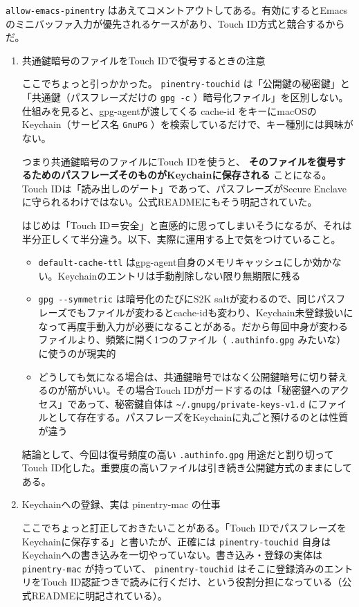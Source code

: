 \documentclass[11pt]{article}
\begin{document}
\texttt{allow-emacs-pinentry} はあえてコメントアウトしてある。有効にするとEmacsのミニバッファ入力が優先されるケースがあり、Touch ID方式と競合するからだ。
\begin{enumerate}
\item 共通鍵暗号のファイルをTouch IDで復号するときの注意
\label{sec:org3da6a7f}

ここでちょっと引っかかった。 \texttt{pinentry-touchid} は「公開鍵の秘密鍵」と「共通鍵（パスフレーズだけの \texttt{gpg -c}  ）暗号化ファイル」を区別しない。仕組みを見ると、gpg-agentが渡してくる cache-id をキーにmacOSのKeychain（サービス名 \texttt{GnuPG} ）を検索しているだけで、キー種別には興味がない。

つまり共通鍵暗号のファイルにTouch IDを使うと、 \textbf{そのファイルを復号するためのパスフレーズそのものがKeychainに保存される} ことになる。Touch IDは「読み出しのゲート」であって、パスフレーズがSecure Enclaveに守られるわけではない。公式READMEにもそう明記されていた。

はじめは「Touch ID＝安全」と直感的に思ってしまいそうになるが、それは半分正しくて半分違う。以下、実際に運用する上で気をつけていること。

\begin{itemize}
\item \texttt{default-cache-ttl} はgpg-agent自身のメモリキャッシュにしか効かない。Keychainのエントリは手動削除しない限り無期限に残る
\item \texttt{gpg -{}-{}symmetric} は暗号化のたびにS2K saltが変わるので、同じパスフレーズでもファイルが変わるとcache-idも変わり、Keychain未登録扱いになって再度手動入力が必要になることがある。だから毎回中身が変わるファイルより、頻繁に開く1つのファイル（ \texttt{.authinfo.gpg} みたいな）に使うのが現実的
\item どうしても気になる場合は、共通鍵暗号ではなく公開鍵暗号に切り替えるのが筋がいい。その場合Touch IDがガードするのは「秘密鍵へのアクセス」であって、秘密鍵自体は \texttt{\textasciitilde{}/.gnupg/private-keys-v1.d} にファイルとして存在する。パスフレーズをKeychainに丸ごと預けるのとは性質が違う
\end{itemize}

結論として、今回は復号頻度の高い \texttt{.authinfo.gpg} 用途だと割り切ってTouch ID化した。重要度の高いファイルは引き続き公開鍵方式のままにしてある。
\item Keychainへの登録、実は pinentry-mac の仕事
\label{sec:orgf593712}

ここでちょっと訂正しておきたいことがある。「Touch IDでパスフレーズをKeychainに保存する」と書いたが、正確には \texttt{pinentry-touchid} 自身はKeychainへの書き込みを一切やっていない。書き込み・登録の実体は \texttt{pinentry-mac} が持っていて、 \texttt{pinentry-touchid} はそこに登録済みのエントリをTouch ID認証つきで読みに行くだけ、という役割分担になっている（公式READMEに明記されている）。


\end{enumerate}
\end{document}
